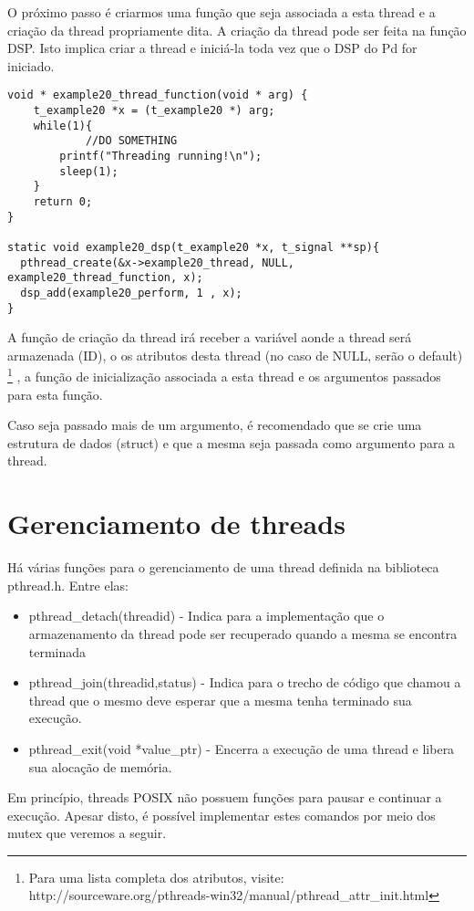 O próximo passo é criarmos uma função que seja associada a esta thread e a criação da thread 
propriamente dita. A criação da thread pode ser feita na função DSP. Isto implica criar a thread
e iniciá-la toda vez que o DSP do Pd for iniciado.

\begin{lstlisting}
void * example20_thread_function(void * arg) {
    t_example20 *x = (t_example20 *) arg;
    while(1){
            //DO SOMETHING
	    printf("Threading running!\n");
	    sleep(1);
	}
    return 0;
}

static void example20_dsp(t_example20 *x, t_signal **sp){
  pthread_create(&x->example20_thread, NULL, example20_thread_function, x);
  dsp_add(example20_perform, 1 , x);
}
\end{lstlisting}

A função de criação da thread irá receber a variável aonde a thread será armazenada (ID), 
o os atributos desta thread (no caso de NULL, serão o default)
\footnote{Para uma lista completa dos atributos, visite: 
http://sourceware.org/pthreads-win32/manual/pthread\_attr\_init.html} ,
 a função de inicialização associada a esta thread e os argumentos passados para esta função. 

Caso seja passado mais de um argumento, é recomendado que se crie uma estrutura de dados (struct)
e que a mesma seja passada como argumento para a thread.

\section{Gerenciamento de threads}

Há várias funções para o gerenciamento de uma thread definida na biblioteca pthread.h. Entre elas:
\begin{itemize}
\item pthread\_detach(threadid) - Indica para a implementação que o armazenamento da thread pode ser recuperado 
quando a mesma se encontra terminada
\item pthread\_join(threadid,status) - Indica para o trecho de código que chamou a thread que o mesmo deve esperar
que a mesma tenha terminado sua execução.
\item pthread\_exit(void *value\_ptr) - Encerra a execução de uma thread e libera sua alocação de memória.
\end{itemize}

Em princípio, threads POSIX não possuem funções para pausar e continuar a execução. Apesar disto, é possível 
implementar estes comandos por meio dos mutex que veremos a seguir.

